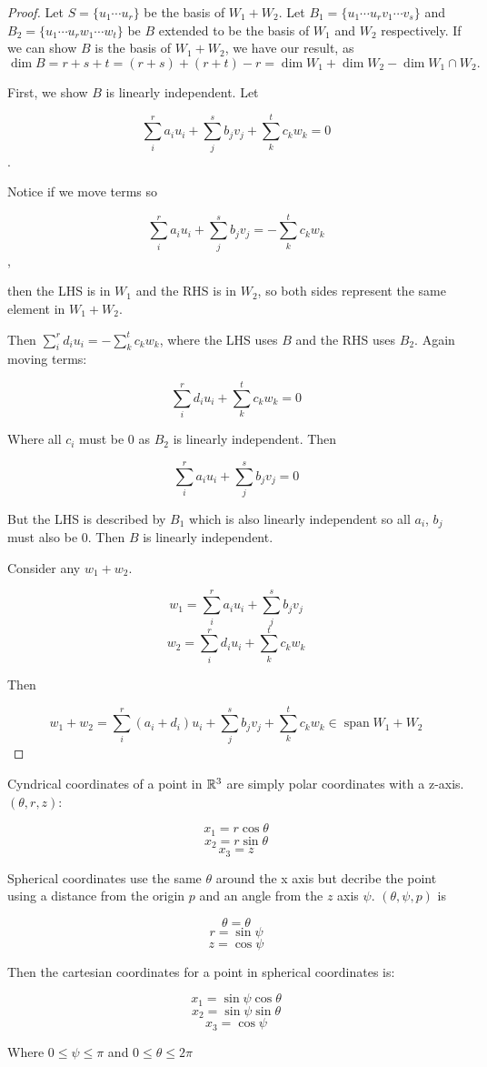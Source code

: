 \documentclass[10pt]{article}
\begin{document}
\begin{proof}
	Let $S = \{ u_1 \cdots u_r \}$ be the basis of $W_1 + W_2$. Let $B_1 = \{ u_1 \cdots u_r v_1 \cdots v_s \}$ and $B_2 = \{ u_1 \cdots u_r w_1 \cdots w_t \}$ be $B$ extended to be the basis of $W_1$ and $W_2$ respectively. 
	If we can show $B$ is the basis of $W_1 + W_2$, we have our result, as $\dim B = r + s + t = (r + s) + (r + t) - r = \dim W_1 + \dim W_2 - \dim W_1 \cap W_2.$

	First, we show $B$ is linearly independent. Let 

	\[\sum_i^r{a_iu_i} + \sum_j^s{b_jv_j} + \sum_k^t{c_kw_k} = 0\]. 

	Notice if we move terms so 

	\[\sum_i^r{a_iu_i} + \sum_j^s{b_jv_j} = -\sum_k^t{c_kw_k}\], 

	then the LHS is in $W_1$ and the RHS is in $W_2$, so both sides represent the same element in $W_1 + W_2$. 

	Then $\sum_i^r{d_iu_i} = -\sum_k^t{c_kw_k}$, where the LHS uses $B$ and the RHS uses $B_2$. Again moving terms:

	\[\sum_i^r{d_iu_i} + \sum_k^t{c_kw_k} = 0\]

	Where all $c_i$ must be 0 as $B_2$ is linearly independent. Then

	\[\sum_i^r{a_iu_i} + \sum_j^s{b_jv_j} = 0\]

	But the LHS is described by $B_1$ which is also linearly independent so all $a_i$, $b_j$ must also be 0. Then $B$ is linearly independent.

	Consider any $w_1 + w_2$. 

	\[w_1 = \sum_i^r{a_iu_i} + \sum_j^s{b_jv_j}\]
	\[w_2 = \sum_i^r{d_iu_i} + \sum_k^t{c_kw_k}\]

	Then

	\[w_1 + w_2 = \sum_i^r{(a_i + d_i) u_i} + \sum_j^s{b_jv_j} + \sum_k^t{c_kw_k} \in \operatorname{span} W_1 + W_2 \]

\end{proof}

\begin{note}

	Cyndrical coordinates of a point in $\mathbb{R}^3$ are simply polar coordinates with
	a z-axis. $(\theta, r, z)$:

	\[ x_1 = r \cos \theta \]
	\[ x_2 = r \sin \theta \]
	\[ x_3 = z \]

	Spherical coordinates use the same $\theta$ around the x axis but decribe the
	point using a distance from the origin $p$ and an angle from the $z$ axis
	$\psi$. $(\theta, \psi, p)$ is 

	\[\theta = \theta \]
	\[r = \sin \psi \]
	\[z = \cos \psi \]

	Then the cartesian coordinates for a point in spherical coordinates is:

	\[x_1 = \sin \psi \cos \theta \]
	\[x_2 = \sin \psi \sin \theta \]
	\[x_3 = \cos \psi \]

	Where $0 \leq \psi \leq \pi$ and $0 \leq \theta \leq 2\pi$

\end{note}
\end{document}
